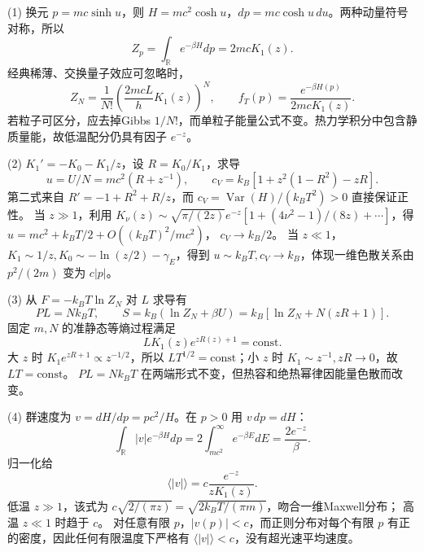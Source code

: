 (1) 换元 \(p=mc\sinh u\)，则 \(H=mc^2\cosh u\)，\(dp=mc\cosh u\,du\)。两种动量符号对称，所以
\[
Z_p=\int_\mathbb R e^{-\beta H}dp=2mcK_1(z).
\]
经典稀薄、交换量子效应可忽略时，
\[
\boxed{Z_N=\frac1{N!}\left(\frac{2mcL}{h}K_1(z)\right)^N},\qquad
f_T(p)=\frac{e^{-\beta H(p)}}{2mcK_1(z)}.
\]
若粒子可区分，应去掉Gibbs \(1/N!\)，而单粒子能量公式不变。热力学积分中包含静质量能，故低温配分仍具有因子 \(e^{-z}\)。

(2) \(K_1'=-K_0-K_1/z\)，设 \(R=K_0/K_1\)，求导
\[
\boxed{u=U/N=mc^2(R+z^{-1})},\qquad
\boxed{c_V=k_B[1+z^2(1-R^2)-zR]}.
\]
第二式来自 \(R'=-1+R^2+R/z\)，而
\(c_V=\operatorname{Var}(H)/(k_BT^2)>0\) 直接保证正性。
当 \(z\gg1\)，利用
\(K_\nu(z)\sim \sqrt{\pi/(2z)}e^{-z}[1+(4\nu^2-1)/(8z)+\cdots]\)，得
\(u=mc^2+k_BT/2+O((k_BT)^2/mc^2)\)，
\(c_V\to k_B/2\)。
当 \(z\ll1\)，\(K_1\sim 1/z,K_0\sim-\ln(z/2)-\gamma_E\)，得到 \(u\sim k_BT,c_V\to k_B\)，体现一维色散关系由 \(p^2/(2m)\) 变为 \(c|p|\)。

(3) 从 \(F=-k_BT\ln Z_N\) 对 \(L\) 求导有
\[
PL=Nk_BT,\qquad S=k_B(\ln Z_N+\beta U)
=k_B[\ln Z_N+N(zR+1)].
\]
固定 \(m,N\) 的准静态等熵过程满足
\[
\boxed{L K_1(z)e^{zR(z)+1}=\mathrm{const}}.
\]
大 \(z\) 时 \(K_1 e^{zR+1}\propto z^{-1/2}\)，所以
\(LT^{1/2}=\mathrm{const}\)；小 \(z\) 时 \(K_1\sim z^{-1}, zR\to0\)，故
\(LT=\mathrm{const}\)。
\(PL=Nk_BT\) 在两端形式不变，但热容和绝热幂律因能量色散而改变。

(4) 群速度为 \(v=dH/dp=pc^2/H\)。在 \(p>0\) 用 \(v\,dp=dH\)：
\[
\int_{\mathbb R}|v|e^{-\beta H}dp
=2\int_{mc^2}^\infty e^{-\beta E}dE=\frac{2e^{-z}}{\beta}.
\]
归一化给
\[
\boxed{\langle|v|\rangle=c\frac{e^{-z}}{zK_1(z)}}.
\]
低温 \(z\gg1\)，该式为 \(c\sqrt{2/(\pi z)}=
\sqrt{2k_BT/(\pi m)}\)，吻合一维Maxwell分布；
高温 \(z\ll1\) 时趋于 \(c\)。
对任意有限 \(p\)，\(|v(p)|<c\)，而正则分布对每个有限 \(p\) 有正的密度，因此任何有限温度下严格有 \(\langle|v|\rangle<c\)，没有超光速平均速度。
